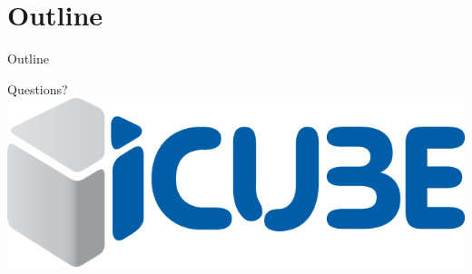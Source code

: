 %
%





\begin {frame} [plain]
    \titlepage
\end {frame}

\section* {Outline}

\begin {frame} {Outline}
    \tableofcontents
\end {frame}







\begin {frame} {Questions?}
    \includegraphics [width=\textwidth,keepaspectratio] {img/icube}
\end {frame}


